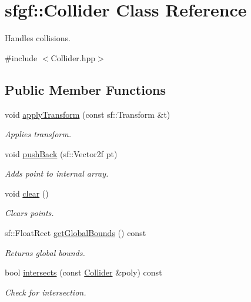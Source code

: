 \hypertarget{classsfgf_1_1Collider}{}\section{sfgf\+:\+:Collider Class Reference}
\label{classsfgf_1_1Collider}


Handles collisions.  




{\ttfamily \#include $<$Collider.\+hpp$>$}

\subsection*{Public Member Functions}
\begin{DoxyCompactItemize}
\item 
void \hyperlink{classsfgf_1_1Collider_ab76aa2334b97723309dec9c06f13e5aa}{apply\+Transform} (const sf\+::\+Transform \&t)
\begin{DoxyCompactList}\small\item\em Applies transform. \end{DoxyCompactList}\item 
void \hyperlink{classsfgf_1_1Collider_ac7ada2ab00581dccb5d4590d0ec80d57}{push\+Back} (sf\+::\+Vector2f pt)
\begin{DoxyCompactList}\small\item\em Adds point to internal array. \end{DoxyCompactList}\item 
void \hyperlink{classsfgf_1_1Collider_a4db86f18fef1c67dfa2523f106096fc8}{clear} ()
\begin{DoxyCompactList}\small\item\em Clears points. \end{DoxyCompactList}\item 
sf\+::\+Float\+Rect \hyperlink{classsfgf_1_1Collider_a7625649032857e18d7b27bd7bed18c24}{get\+Global\+Bounds} () const 
\begin{DoxyCompactList}\small\item\em Returns global bounds. \end{DoxyCompactList}\item 
bool \hyperlink{classsfgf_1_1Collider_ad6a628c00cfd66ccb06792c91305007e}{intersects} (const \hyperlink{classsfgf_1_1Collider}{Collider} \&poly) const 
\begin{DoxyCompactList}\small\item\em Check for intersection. \end{DoxyCompactList}\item 

\end{DoxyCompactItemize}
